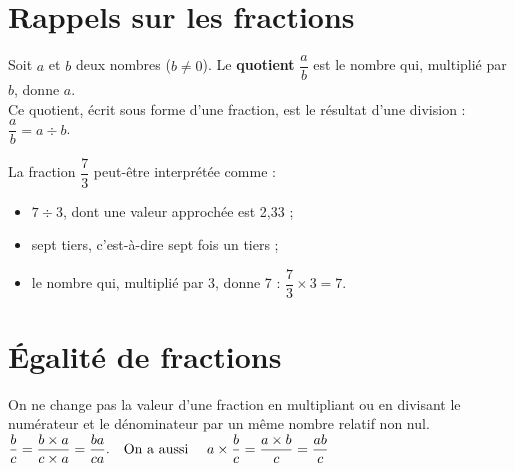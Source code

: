 \cours 

\section{Rappels sur les fractions} %

\begin{definition}
   Soit $a$ et $b$ deux nombres ($b\neq0$). Le {\bf quotient} $\dfrac{a}{b}$ est le nombre qui, multiplié par $b$, donne $a$. \\
   Ce quotient, écrit sous forme d'une fraction, est le résultat d'une division : $\dfrac{a}{b} =a\div b$.
\end{definition}

\begin{exemple}
   La fraction $\dfrac73$ peut-être interprétée comme :
   \correction
   \ \\ [-10mm]
   \begin{itemize}
      \item $7\div3$, dont une valeur approchée est 2,33 ;
      \item sept tiers, c'est-à-dire sept fois un tiers ;
      \item le nombre qui, multiplié par 3, donne
      7 : $\dfrac73\times3 =7$.
   \end{itemize}
\end{exemple}


\section{Égalité de fractions} %

\begin{propriete}
   On ne change pas la valeur d'une fraction en multipliant ou en divisant le numérateur et le dénominateur par un même nombre relatif non nul. \\ [1mm]
   \hspace*{3cm} $\dfrac{b}{c} =\dfrac{b\times a}{c\times a}= \dfrac{ba}{ca}. \text{\quad On a aussi \quad }a\times\dfrac{b}{c}= \dfrac{a\times b}{c} =\dfrac{ab}{c}$
\end{propriete}


